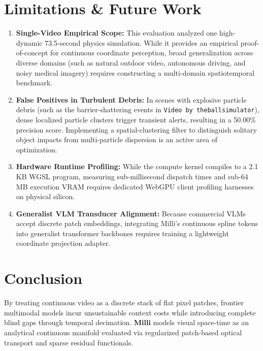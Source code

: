 \documentclass[11pt]{article}
\begin{document}
\section{Limitations \& Future Work}

\begin{enumerate}
    \item \textbf{Single-Video Empirical Scope:} This evaluation analyzed one high-dynamic 73.5-second physics simulation. While it provides an empirical proof-of-concept for continuous coordinate perception, broad generalization across diverse domains (such as natural outdoor video, autonomous driving, and noisy medical imagery) requires constructing a multi-domain spatiotemporal benchmark.
    \item \textbf{False Positives in Turbulent Debris:} In scenes with explosive particle debris (such as the barrier-shattering events in \texttt{Video by theballsimulator}), dense localized particle clusters trigger transient alerts, resulting in a 50.00\% precision score. Implementing a spatial-clustering filter to distinguish solitary object impacts from multi-particle dispersion is an active area of optimization.
    \item \textbf{Hardware Runtime Profiling:} While the compute kernel compiles to a 2.1\,KB WGSL program, measuring sub-millisecond dispatch times and sub-64\,MB execution VRAM requires dedicated WebGPU client profiling harnesses on physical silicon.
    \item \textbf{Generalist VLM Transducer Alignment:} Because commercial VLMs accept discrete patch embeddings, integrating Milli's continuous spline tokens into generalist transformer backbones requires training a lightweight coordinate projection adapter.
\end{enumerate}

\section{Conclusion}

By treating continuous video as a discrete stack of flat pixel patches, frontier multimodal models incur unsustainable context costs while introducing complete blind gaps through temporal decimation. \textbf{Milli} models visual space-time as an analytical continuous manifold evaluated via regularized patch-based optical transport and sparse residual functionals.
\end{document}
